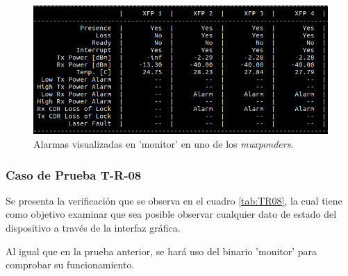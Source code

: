   \begin{figure}[H]
	\centering
	\includegraphics[scale=0.5]{Figures/test7_3.png}
	\caption{Alarmas visualizadas en 'monitor' en uno de los \textit{muxponders}.}
	\label{fig:test7_3}
  \end{figure}

  \subsubsection{Caso de Prueba T-R-08}

  Se presenta la verificación que se observa en el cuadro \ref{tab:TR08}, la cual tiene como objetivo examinar que sea posible observar cualquier dato de estado del dispositivo a través de la interfaz gráfica. 
  
  Al igual que en la prueba anterior, se hará uso del binario 'monitor' para comprobar su funcionamiento.
  
